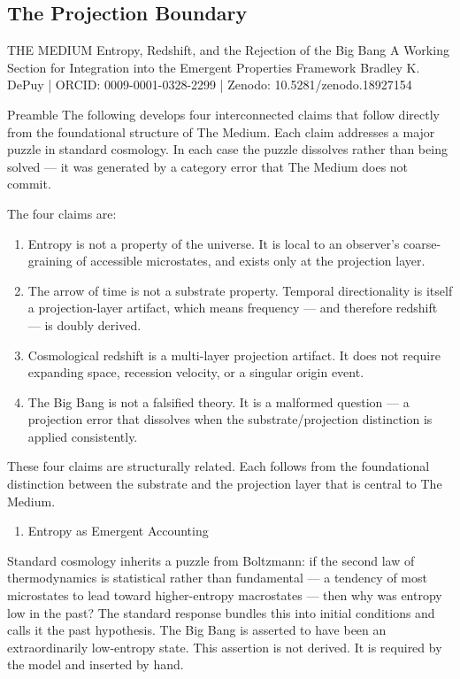 \documentclass[11pt,letterpaper]{article}
\begin{document}
\subsection{The Projection Boundary}
\label{sec:orgedefe04}
THE MEDIUM
Entropy, Redshift, and the Rejection of the Big Bang
A Working Section for Integration into the Emergent Properties Framework
Bradley K. DePuy  |  ORCID: 0009-0001-0328-2299  |  Zenodo: 10.5281/zenodo.18927154


Preamble
The following develops four interconnected claims that follow directly from the foundational structure of The Medium. Each claim addresses a major puzzle in standard cosmology. In each case the puzzle dissolves rather than being solved — it was generated by a category error that The Medium does not commit.

The four claims are:
\begin{enumerate}
\item Entropy is not a property of the universe. It is local to an observer's coarse-graining of accessible microstates, and exists only at the projection layer.
\item The arrow of time is not a substrate property. Temporal directionality is itself a projection-layer artifact, which means frequency — and therefore redshift — is doubly derived.
\item Cosmological redshift is a multi-layer projection artifact. It does not require expanding space, recession velocity, or a singular origin event.
\item The Big Bang is not a falsified theory. It is a malformed question — a projection error that dissolves when the substrate/projection distinction is applied consistently.
\end{enumerate}

These four claims are structurally related. Each follows from the foundational distinction between the substrate and the projection layer that is central to The Medium.


\begin{enumerate}
\item Entropy as Emergent Accounting
\end{enumerate}

Standard cosmology inherits a puzzle from Boltzmann: if the second law of thermodynamics is statistical rather than fundamental — a tendency of most microstates to lead toward higher-entropy macrostates — then why was entropy low in the past? The standard response bundles this into initial conditions and calls it the past hypothesis. The Big Bang is asserted to have been an extraordinarily low-entropy state. This assertion is not derived. It is required by the model and inserted by hand.
\end{document}
